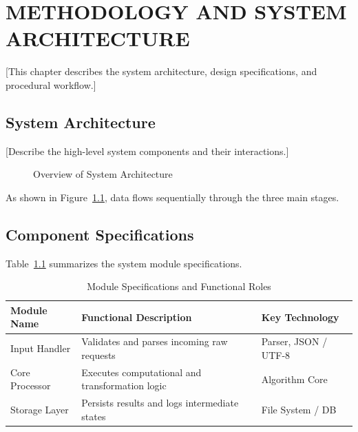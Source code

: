 \chapter{METHODOLOGY AND SYSTEM ARCHITECTURE}
\label{chap:methodology}

[This chapter describes the system architecture, design specifications, and procedural workflow.]

\section{System Architecture}
\label{sec:architecture}

[Describe the high-level system components and their interactions.]

\begin{figure}[H]
    \centering
    \caption{Overview of System Architecture}
    \label{fig:sample_architecture}
\end{figure}

As shown in Figure~\ref{fig:sample_architecture}, data flows sequentially through the three main stages.

\section{Component Specifications}
\label{sec:specifications}

Table~\ref{tab:sample_specifications} summarizes the system module specifications.

\begin{table}[H]
    \caption{Module Specifications and Functional Roles}
    \label{tab:sample_specifications}
    \centering
    \begin{tabular}{|l|p{6cm}|p{4.5cm}|}
        \hline
        \textbf{Module Name} & \textbf{Functional Description} & \textbf{Key Technology} \\ \hline
        Input Handler & Validates and parses incoming raw requests & Parser, JSON / UTF-8 \\ \hline
        Core Processor & Executes computational and transformation logic & Algorithm Core \\ \hline
        Storage Layer & Persists results and logs intermediate states & File System / DB \\ \hline
    \end{tabular}
\end{table}
